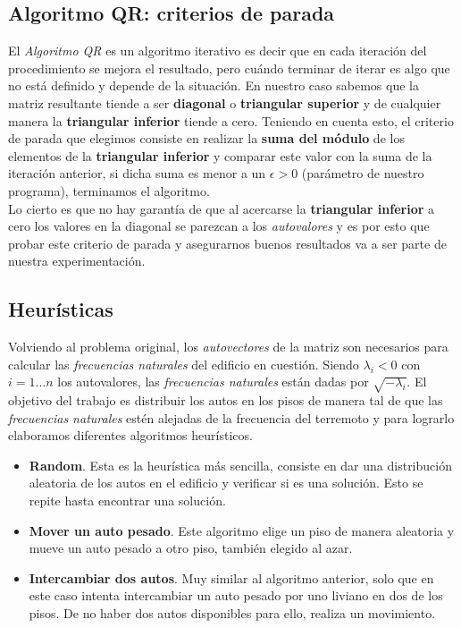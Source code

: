 \documentclass[a4paper]{article}
\begin{document}
\subsection{Algoritmo QR: criterios de parada}

El \textit{Algoritmo QR} es un algoritmo iterativo es decir que en cada iteración del procedimiento se mejora el resultado, pero cuándo terminar de iterar es algo que no está definido y depende de la situación. En nuestro caso sabemos que la matriz resultante tiende a ser \textbf{diagonal} o \textbf{triangular superior} y de cualquier manera la \textbf{triangular inferior} tiende a cero. Teniendo en cuenta esto, el criterio de parada que elegimos consiste en realizar la \textbf{suma del módulo} de los elementos de la \textbf{triangular inferior} y comparar este valor con la suma de la iteración anterior, si dicha suma es menor a un $\epsilon > 0$ (parámetro de nuestro programa), terminamos el algoritmo.\\
Lo cierto es que no hay garantía de que al acercarse la \textbf{triangular inferior} a cero los valores en la diagonal se parezcan a los \textit{autovalores} y es por esto que probar este criterio de parada y asegurarnos buenos resultados va a ser parte de nuestra experimentación.

\subsection{Heurísticas}

Volviendo al problema original, los \textit{autovectores} de la matriz son necesarios para calcular las \textit{frecuencias naturales} del edificio en cuestión. Siendo $\lambda_i < 0$ con $i = 1 \hdots n$ los autovalores, las \textit{frecuencias naturales} están dadas por $\sqrt{-\lambda_i}$. El objetivo del trabajo es distribuir los autos en los pisos de manera tal de que las \textit{frecuencias naturales} estén alejadas de la frecuencia del terremoto y para lograrlo elaboramos diferentes algoritmos heurísticos.

\begin{itemize}
  \item \textbf{Random}. Esta es la heurística más sencilla, consiste en dar una distribución aleatoria de los autos en el edificio y verificar si es una solución. Esto se repite hasta encontrar una solución.
  \item \textbf{Mover un auto pesado}. Este algoritmo elige un piso de manera aleatoria y mueve un auto pesado a otro piso, también elegido al azar.
  \item \textbf{Intercambiar dos autos}. Muy similar al algoritmo anterior, solo que en este caso intenta intercambiar un auto pesado por uno liviano en dos de los pisos. De no haber dos autos disponibles para ello, realiza un movimiento.
\end{itemize}
\end{document}
